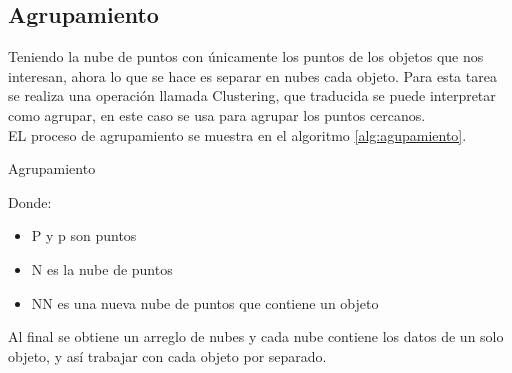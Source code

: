             
    \subsection{Agrupamiento}
    
        Teniendo la nube de puntos con únicamente los puntos de los objetos que nos interesan, ahora lo que se hace es separar en nubes cada objeto. Para esta tarea se realiza una operación llamada Clustering, que traducida se puede interpretar como agrupar, en este caso se usa para agrupar los puntos cercanos.\\
        
        EL proceso de agrupamiento se muestra en el \gls{algoritmo} \ref{alg:agupamiento}.        
        \begin{algorithm}
        	\caption{Agrupamiento}
        	\label{alg:agupamiento}
        \end{algorithm}
        
        Donde:
        \begin{itemize}
            \item P y p son puntos\\
            \item N es la nube de puntos\\
            \item NN es una nueva nube de puntos que contiene un objeto\\
        \end{itemize}  
        Al final se obtiene un arreglo de nubes y cada nube contiene los datos de un solo objeto, y así trabajar con cada objeto por separado.\\
        
        
        
            
